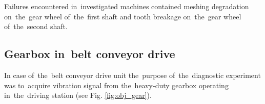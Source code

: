 Failures encountered in~investigated machines contained meshing degradation on~the~gear wheel of~the~first shaft and tooth breakage on~the~gear wheel of~the~second shaft.




\subsection{Gearbox in~belt conveyor drive}

In case of~the~belt conveyor drive unit the~purpose of~the~diagnostic experiment was to~acquire vibration signal from the~heavy-duty gearbox operating in~the~driving station (see Fig. \ref{fig:obj_gear}). 


